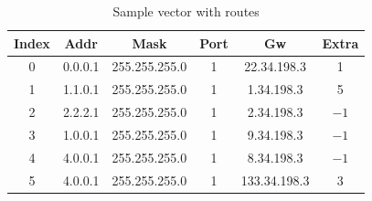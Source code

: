 \documentclass[a4paper]{article}
\begin{document}
\begin{table}[float=tph]
\begin{center}
\begin{tabular}{cccccc}
\toprule 
Index & Addr & Mask & Port & Gw & Extra\\ 
\midrule
       0 & 0.0.0.1 & 255.255.255.0 & 1& 22.34.198.3 & 1\\ 
\hline
      1 & 1.1.0.1 & 255.255.255.0 & 1& 1.34.198.3 & 5\\
\hline 
      2 & 2.2.2.1 & 255.255.255.0 & 1& 2.34.198.3 & $-1$\\
\hline 
      3 & 1.0.0.1 & 255.255.255.0 & 1& 9.34.198.3 & $-1$\\
\hline 
      4 & 4.0.0.1 & 255.255.255.0 & 1& 8.34.198.3 & $-1$\\
\hline 
      5 & 4.0.0.1 & 255.255.255.0 & 1& 133.34.198.3 & 3\\
\bottomrule
\end{tabular}
\end{center}
\caption{Sample vector with routes}
\label{tbl:vector}
\end{table}
\end{document}
